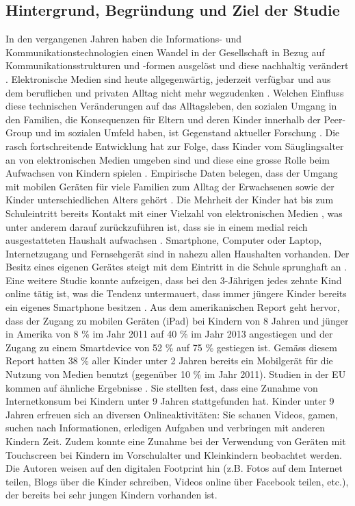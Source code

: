 \subsection{Hintergrund, Begründung und Ziel der Studie}\label{sec:Hintergrund}
In den vergangenen Jahren haben die Informations- und Kommunikationstechnologien einen Wandel in der Gesellschaft in Bezug auf Kommunikationsstrukturen und -formen ausgelöst und diese nachhaltig verändert \cite{Hasebrink2009, Bms2013}. Elektronische Medien sind heute allgegenwärtig, jederzeit verfügbar und aus dem beruflichen und privaten Alltag nicht mehr wegzudenken \cite{Bmfsfj2013}. Welchen Einfluss diese technischen Veränderungen auf das Alltagsleben, den sozialen Umgang in den Familien, die Konsequenzen für Eltern und deren Kinder innerhalb der Peer-Group und im sozialen Umfeld haben, ist Gegenstand aktueller Forschung \cite{Olafsson2014}. Die rasch fortschreitende Entwicklung hat zur Folge, dass Kinder vom Säuglingsalter an von elektronischen Medien umgeben sind und diese eine grosse Rolle beim Aufwachsen von Kindern spielen \cite{Feierabend2015, Divsi2015}. Empirische Daten belegen, dass der Umgang mit mobilen Geräten für viele Familien zum Alltag der Erwachsenen sowie der Kinder unterschiedlichen Alters gehört \cite{Wagner2016}. Die Mehrheit der Kinder hat bis zum Schuleintritt bereits Kontakt mit einer Vielzahl von elektronischen Medien \cite{Feierabend2015}, was unter anderem darauf zurückzuführen ist, dass sie in einem medial reich ausgestatteten Haushalt aufwachsen \cite{Suter2015}. Smartphone, Computer oder Laptop, Internetzugang und Fernsehgerät sind in nahezu allen Haushalten vorhanden. Der Besitz eines eigenen Gerätes steigt mit dem Eintritt in die Schule sprunghaft an \cite{Feierabend2015a}. Eine weitere Studie konnte aufzeigen, dass bei den 3-Jährigen jedes zehnte Kind online tätig ist, was die Tendenz untermauert, dass immer jüngere Kinder bereits ein eigenes Smartphone besitzen \cite{Divsi2015}. Aus dem amerikanischen Report  geht hervor, dass der Zugang zu mobilen Geräten (iPad) bei Kindern von 8 Jahren und jünger in Amerika von 8 \% im Jahr 2011 auf 40 \% im Jahr 2013 angestiegen und der Zugang zu einem Smartdevice von 52 \% auf 75 \% gestiegen ist. Gemäss diesem Report hatten 38 \% aller Kinder unter 2 Jahren bereits ein Mobilgerät für die Nutzung von Medien benutzt (gegenüber 10 \% im Jahr 2011). Studien in der EU kommen auf ähnliche Ergebnisse \cite{Holloway2013}. Sie stellten fest, dass eine Zunahme von Internetkonsum bei Kindern unter 9 Jahren stattgefunden hat. Kinder unter 9 Jahren erfreuen sich an diversen Onlineaktivitäten: Sie schauen Videos, gamen, suchen nach Informationen, erledigen Aufgaben
und verbringen mit anderen Kindern Zeit. Zudem konnte eine Zunahme bei der Verwendung von Geräten mit Touchscreen bei Kindern im Vorschulalter und Kleinkindern beobachtet werden. Die Autoren weisen auf den digitalen Footprint hin (z.B. Fotos auf dem Internet teilen, Blogs über die Kinder schreiben, Videos online über Facebook teilen, etc.), der bereits bei sehr jungen Kindern vorhanden ist.

